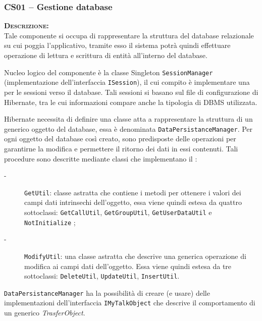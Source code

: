 \subsubsection{CS01 -- Gestione database}\label{sec:cs01}
\begin{description}
\item{\scshape\bfseries Descrizione:}\\
Tale componente si occupa di rappresentare la struttura del database relazionale su cui poggia l'applicativo, tramite esso il sistema potrà quindi effettuare operazione di lettura e scrittura di entità all'interno del database.

Nucleo logico del componente è la classe Singleton \texttt{SessionManager} (implementazione dell'interfaccia \texttt{ISession}), il cui compito è implementare una  per le sessioni verso il database. Tali sessioni si basano sul file di configurazione di Hibernate, tra le cui informazioni compare anche la tipologia di DBMS utilizzata.

Hibernate necessita di definire una classe atta a rappresentare la struttura di un generico oggetto del database, essa è denominata \texttt{DataPersistanceManager}.
Per ogni oggetto del database così creato, sono predisposte delle operazioni per garantirne la modifica e permettere il ritorno dei dati in essi contenuti. Tali procedure sono descritte mediante  classi che implementano il  :

\begin{description}
\item[-] \texttt{GetUtil}: classe astratta che contiene i metodi per ottenere i valori dei campi dati intrinsechi dell'oggetto, essa viene quindi estesa da quattro sottoclassi: \texttt{GetCallUtil}, \texttt{GetGroupUtil}, \texttt{GetUserDataUtil} e \texttt{NotInitialize} ;
\item[-] \texttt{ModifyUtil}: una classe astratta che descrive una generica operazione di modifica ai campi dati dell'oggetto. Essa viene quindi estesa da tre sottoclassi: \texttt{DeleteUtil}, \texttt{UpdateUtil}, \texttt{InsertUtil}.
\end{description}

\texttt{DataPersistanceManager} ha la possibilità di creare (e usare) delle implementazioni dell'interfaccia \texttt{IMyTalkObject} che descrive il comportamento di un generico \textit{TrasferObject}.



\end{description}
